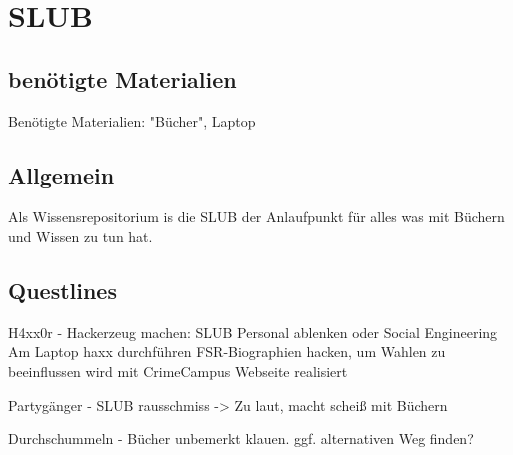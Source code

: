 \section{SLUB}
\subsection{benötigte Materialien}
Benötigte Materialien: "Bücher", Laptop

\subsection{Allgemein}
Als Wissensrepositorium is die SLUB der Anlaufpunkt für alles was mit Büchern und Wissen zu tun hat.

\subsection{Questlines}
H4xx0r - Hackerzeug machen:
    SLUB Personal ablenken oder Social Engineering
    Am Laptop haxx durchführen
    FSR-Biographien hacken, um Wahlen zu beeinflussen
    wird mit CrimeCampus Webseite realisiert

Partygänger - SLUB rausschmiss -> Zu laut, macht scheiß mit Büchern

Durchschummeln - Bücher unbemerkt klauen. ggf. alternativen Weg finden?